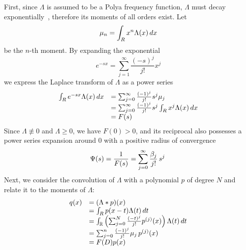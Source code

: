 \documentclass{article}
\newcommand{\nequiv}{\mathrel{\not\equiv}}
\providecommand{\*}{{\opl}}
\newcommand{\field}[1]{#1}
\newcommand{\bR}{\field{R}}
\newcommand{\<}{}
\newcommand{\>}{}
\newcommand{\pff}{Polya frequency function}
\begin{document}
First, since $\Lambda$ is assumed to be a {\pff}, $\Lambda$ must decay
exponentially~{\cite[Lemma~2]{sch51}}, therefore its moments of all orders
exist. Let
\begin{equation}
  \mu_n = \int_{\bR} x^n \Lambda (x)  \hspace{0.17em} dx
\end{equation}
be the $n$-th moment. By expanding the exponential
\begin{equation}
  e^{- sx} = \sum_{j = 1}^{\infty} \frac{(- s)^j}{j!} x^j
\end{equation}
we express the Laplace transform of $\Lambda$ as a power series
\begin{equation}
  \label{eq:nn2} \begin{array}{ll}
    \int_{\bR} e^{- sx} \Lambda (x)  \hspace{0.17em} dx & = \sum_{j =
    0}^{\infty} \frac{(- 1)^j}{j!} s^j \mu_j  \hspace{0.17em}\\
    & = \sum_{j = 0}^{\infty} \frac{(- 1)^j}{j!} s^j \int_{\bR} x^j \Lambda
    (x)  \hspace{0.17em} dx\\
    & = F (s)
  \end{array}
\end{equation}
Since $\Lambda \nequiv 0$ and $\Lambda \geq 0$, we have $F (0) > 0$, and its
reciprocal also possesses a power series expansion around $0$ with a positive
radius of convergence
\begin{equation}
  \Psi (s) = \frac{1}{F (s)} = \sum_{j = 0}^{\infty} \frac{\beta_j}{j!} 
  \hspace{0.17em} s^j \hspace{0.17em}
\end{equation}
Next, we consider the convolution of $\Lambda$ with a polynomial $p$ of degree
$N$ and relate it to the moments of $\Lambda$:
\begin{equation}
  \begin{array}{ll}
    q (x) & = (\Lambda \ast p) (x)\\
    & = \int_{\bR} p (x - t) \Lambda (t)  \hspace{0.17em} dt\\
    & = \int_{\mathbb{R}} \left( \sum_{j = 0}^N \frac{(- t)^j}{j!} p^{(j)}
    (x) \right) \Lambda (t)  \hspace{0.17em} dt\\
    & = \sum_{j = 0}^n \frac{(- 1)^j}{j!} \mu_j  \hspace{0.17em} p^{(j)}
    (x)\\
    & = F (D) p (x)
  \end{array}
\end{equation}
\end{document}
